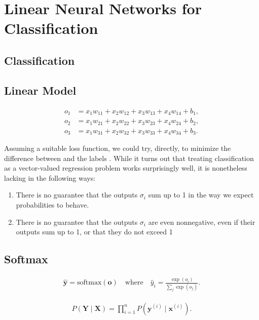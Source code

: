 \documentclass[a4paper,12pt]{article}
\theoremstyle{definition}
\begin{document}
\section{Linear Neural Networks for Classification}
    \subsection*{Classification}

    \subsection*{Linear Model}
    \begin{equation*}
        \begin{aligned}
        o_1 &= x_1 w_{11} + x_2 w_{12} + x_3 w_{13} + x_4 w_{14} + b_1,\\
        o_2 &= x_1 w_{21} + x_2 w_{22} + x_3 w_{23} + x_4 w_{24} + b_2,\\
        o_3 &= x_1 w_{31} + x_2 w_{32} + x_3 w_{33} + x_4 w_{34} + b_3.
        \end{aligned}
    \end{equation*}


    Assuming a suitable loss function, we could try, directly, to minimize the difference between 
 and the labels 
. While it turns out that treating classification as a vector-valued regression problem works surprisingly well, it is nonetheless lacking in the following ways:
\begin{enumerate}
    \item There is no guarantee that the outputs $\sigma_i$ sum up to 1 in the way we expect probabilities to behave.
    \item There is no guarantee that the outputs $\sigma_i$ are even nonnegative, even if their outputs sum up to 1, or that they do not exceed 1
\end{enumerate}
    \subsection*{Softmax}
    \begin{equation*}
        \begin{aligned}
            \hat{\mathbf{y}} = \mathrm{softmax}(\mathbf{o}) \quad \text{where}\quad \hat{y}_i = \frac{\exp(o_i)}{\sum_j \exp(o_j)}.
        \end{aligned}
    \end{equation*}

    \begin{equation*}
        \begin{aligned}
            P(\mathbf{Y} \mid \mathbf{X}) = \prod_{i=1}^n P(\mathbf{y}^{(i)} \mid \mathbf{x}^{(i)}).
        \end{aligned}
    \end{equation*}
\end{document}
